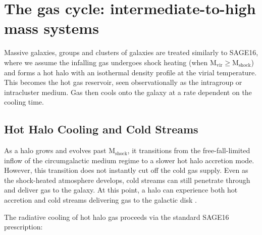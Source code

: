 %
%
%

\section{The gas cycle: intermediate-to-high mass systems}

Massive galaxies, groups and clusters of galaxies are treated similarly to
SAGE16, where we assume the infalling gas undergoes shock heating (when
$\mathrm{M_{vir}} \geq \mathrm{M_{shock}}$) and forms a hot halo with an
isothermal density profile at the virial temperature. This becomes the hot gas
reservoir, seen observationally as the intragroup or intracluster medium. Gas
then cools onto the galaxy at a rate dependent on the cooling time.

\subsection{Hot Halo Cooling and Cold Streams}

As a halo grows and evolves past $\mathrm{M_{shock}}$, it transitions from the
free-fall-limited inflow of the circumgalactic medium regime to a slower hot
halo accretion mode. However, this transition does not instantly cut off the
cold gas supply. Even as the shock-heated atmosphere develops, cold streams can
still penetrate through and deliver gas to the galaxy. At this point, a halo can
experience both hot accretion and cold streams delivering gas to the galactic
disk \citep{Keres2005, DekelBirnboim2006, Dekel2009}.

The radiative cooling of hot halo gas proceeds via the standard SAGE16
prescription:

